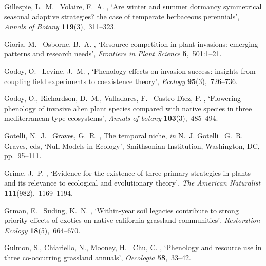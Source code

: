 \documentclass[11pt]{article}
\begin{document}
\begin{thebibliography}{xx}
Gillespie, L.~M. \harvardand\ Volaire, F.~A.  \harvardyearright , `Are winter and summer dormancy symmetrical seasonal
  adaptive strategies? the case of temperate herbaceous perennials', {\em
  Annals of Botany} {\bf 119}(3),~311--323.

Gioria, M. \harvardand\ Osborne, B.~A.  \harvardyearright
  , `Resource competition in plant invasions: emerging patterns and research
  needs', {\em Frontiers in Plant Science} {\bf 5},~501:1--21.

Godoy, O. \harvardand\ Levine, J.~M.  \harvardyearright ,
  `Phenology effects on invasion success: insights from coupling field
  experiments to coexistence theory', {\em Ecology} {\bf 95}(3),~726--736.

Godoy, O., Richardson, D.~M., Valladares, F. \harvardand\ Castro-D{\'\i}ez, P.
  \harvardyearleft 2009\harvardyearright , `Flowering phenology of invasive
  alien plant species compared with native species in three mediterranean-type
  ecosystems', {\em Annals of botany} {\bf 103}(3),~485--494.

Gotelli, N.~J. \harvardand\ Graves, G.~R.  \harvardyearright , The temporal niche, {\em in} N.~J. Gotelli
  \harvardand\ G.~R. Graves, eds, `Null Models in Ecology', Smithsonian
  Institution, Washington, DC, pp.~95--111.

Grime, J.~P.  \harvardyearright , `Evidence for the
  existence of three primary strategies in plants and its relevance to
  ecological and evolutionary theory', {\em The American Naturalist} {\bf
  111}(982),~1169--1194.

Grman, E. \harvardand\ Suding, K.~N.  \harvardyearright ,
  `Within-year soil legacies contribute to strong priority effects of exotics
  on native california grassland communities', {\em Restoration Ecology} {\bf
  18}(5),~664--670.

Gulmon, S., Chiariello, N., Mooney, H. \harvardand\ Chu, C.  \harvardyearleft
  1983\harvardyearright , `Phenology and resource use in three co-occurring
  grassland annuals', {\em Oecologia} {\bf 58},~33--42.


\end{thebibliography}
\end{document}
